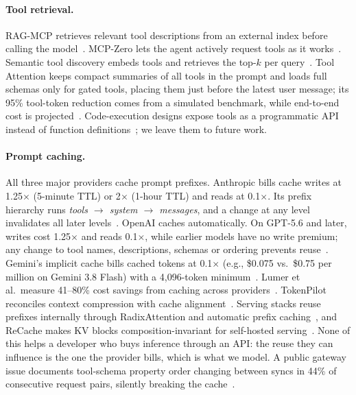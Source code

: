 \documentclass[11pt]{article}
\begin{document}
\paragraph{Tool retrieval.} RAG-MCP retrieves relevant tool descriptions from an external index before calling the model~\cite{ragmcp}. MCP-Zero lets the agent actively request tools as it works~\cite{mcpzero}. Semantic tool discovery embeds tools and retrieves the top-$k$ per query~\cite{semdisc}. Tool Attention keeps compact summaries of all tools in the prompt and loads full schemas only for gated tools, placing them just before the latest user message; its 95\% tool-token reduction comes from a simulated benchmark, while end-to-end cost is projected~\cite{toolattention}. Code-execution designs expose tools as a programmatic API instead of function definitions~\cite{cemcp}; we leave them to future work.

\paragraph{Prompt caching.} All three major providers cache prompt prefixes. Anthropic bills cache writes at 1.25$\times$ (5-minute TTL) or 2$\times$ (1-hour TTL) and reads at 0.1$\times$. Its prefix hierarchy runs \emph{tools $\rightarrow$ system $\rightarrow$ messages}, and a change at any level invalidates all later levels~\cite{anth_cache}. OpenAI caches automatically. On GPT-5.6 and later, writes cost 1.25$\times$ and reads 0.1$\times$, while earlier models have no write premium; any change to tool names, descriptions, schemas or ordering prevents reuse~\cite{oai_cache}. Gemini's implicit cache bills cached tokens at 0.1$\times$ (e.g., \$0.075 vs.\ \$0.75 per million on Gemini 3.8 Flash) with a 4,096-token minimum~\cite{gemini_price}. Lumer et al.\ measure 41--80\% cost savings from caching across providers~\cite{dontbreak}. TokenPilot reconciles context compression with cache alignment~\cite{tokenpilot}. Serving stacks reuse prefixes internally through RadixAttention and automatic prefix caching~\cite{sglang,vllm}, and ReCache makes KV blocks composition-invariant for self-hosted serving~\cite{recache}. None of this helps a developer who buys inference through an API: the reuse they can influence is the one the provider bills, which is what we model. A public gateway issue documents tool-schema property order changing between syncs in 44\% of consecutive request pairs, silently breaking the cache~\cite{bifrost}.
\end{document}

